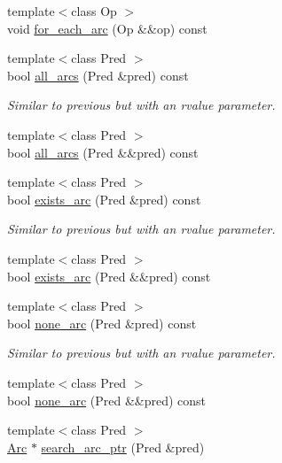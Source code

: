 \begin{DoxyCompactItemize}
{\footnotesize template$<$class Op $>$ }\\void \hyperlink{class_designar_1_1_base_graph_ae76905d5baebd62d0fc481efc7c20f66}{for\+\_\+each\+\_\+arc} (Op \&\&op) const
\item 
{\footnotesize template$<$class Pred $>$ }\\bool \hyperlink{class_designar_1_1_base_graph_a3e2a55dafde6b1edf42f88f4c7d066b8}{all\+\_\+arcs} (Pred \&pred) const
\begin{DoxyCompactList}\small\item\em Similar to previous but with an rvalue parameter. \end{DoxyCompactList}\item 
{\footnotesize template$<$class Pred $>$ }\\bool \hyperlink{class_designar_1_1_base_graph_aea71a873faf7e92195d582b21d14c347}{all\+\_\+arcs} (Pred \&\&pred) const
\item 
{\footnotesize template$<$class Pred $>$ }\\bool \hyperlink{class_designar_1_1_base_graph_aaed186c42ed6b51f761cda959ecde601}{exists\+\_\+arc} (Pred \&pred) const
\begin{DoxyCompactList}\small\item\em Similar to previous but with an rvalue parameter. \end{DoxyCompactList}\item 
{\footnotesize template$<$class Pred $>$ }\\bool \hyperlink{class_designar_1_1_base_graph_aebf517d972db553b03f2c4dbe4228d79}{exists\+\_\+arc} (Pred \&\&pred) const
\item 
{\footnotesize template$<$class Pred $>$ }\\bool \hyperlink{class_designar_1_1_base_graph_a023f28dd8824ba7a0c26342effd0fddf}{none\+\_\+arc} (Pred \&pred) const
\begin{DoxyCompactList}\small\item\em Similar to previous but with an rvalue parameter. \end{DoxyCompactList}\item 
{\footnotesize template$<$class Pred $>$ }\\bool \hyperlink{class_designar_1_1_base_graph_a69c4841b8c517a510d738bc1204da7b7}{none\+\_\+arc} (Pred \&\&pred) const
\item 
{\footnotesize template$<$class Pred $>$ }\\\hyperlink{namespace_designar_a3f55fb5513d62ff47cbc8f72b8e95d6f}{Arc} $\ast$ \hyperlink{class_designar_1_1_base_graph_afcbc602350567bc5a377fd7fc94419ae}{search\+\_\+arc\+\_\+ptr} (Pred \&pred)

\end{DoxyCompactItemize}
